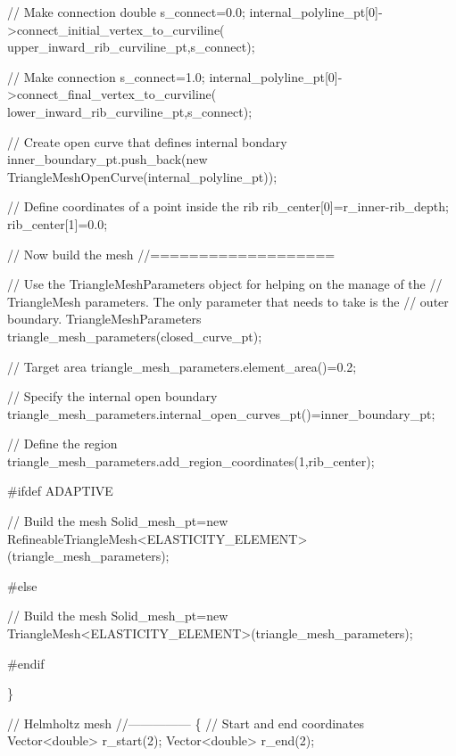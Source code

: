 \begin{DoxyCodeInclude}
  \textcolor{comment}{// Make connection}
  \textcolor{keywordtype}{double} s\_connect=0.0;
  internal\_polyline\_pt[0]->connect\_initial\_vertex\_to\_curviline(
   upper\_inward\_rib\_curviline\_pt,s\_connect);

  \textcolor{comment}{// Make connection}
  s\_connect=1.0;
  internal\_polyline\_pt[0]->connect\_final\_vertex\_to\_curviline(
   lower\_inward\_rib\_curviline\_pt,s\_connect);

  \textcolor{comment}{// Create open curve that defines internal bondary}
  inner\_boundary\_pt.push\_back(\textcolor{keyword}{new} TriangleMeshOpenCurve(internal\_polyline\_pt));
 
  \textcolor{comment}{// Define coordinates of a point inside the rib}
  rib\_center[0]=r\_inner-rib\_depth;
  rib\_center[1]=0.0;


  \textcolor{comment}{// Now build the mesh}
  \textcolor{comment}{//===================}

  \textcolor{comment}{// Use the TriangleMeshParameters object for helping on the manage of the}
  \textcolor{comment}{// TriangleMesh parameters. The only parameter that needs to take is the}
  \textcolor{comment}{// outer boundary.}
  TriangleMeshParameters triangle\_mesh\_parameters(closed\_curve\_pt);

  \textcolor{comment}{// Target area}
  triangle\_mesh\_parameters.element\_area()=0.2;

  \textcolor{comment}{// Specify the internal open boundary}
  triangle\_mesh\_parameters.internal\_open\_curves\_pt()=inner\_boundary\_pt;

  \textcolor{comment}{// Define the region}
  triangle\_mesh\_parameters.add\_region\_coordinates(1,rib\_center);
 
\textcolor{preprocessor}{#ifdef ADAPTIVE}

  \textcolor{comment}{// Build the mesh}
  Solid\_mesh\_pt=\textcolor{keyword}{new} 
   RefineableTriangleMesh<ELASTICITY\_ELEMENT>(triangle\_mesh\_parameters);

\textcolor{preprocessor}{#else}

  \textcolor{comment}{// Build the mesh}
  Solid\_mesh\_pt=\textcolor{keyword}{new} 
   TriangleMesh<ELASTICITY\_ELEMENT>(triangle\_mesh\_parameters);

\textcolor{preprocessor}{#endif}

 \}
 
 \textcolor{comment}{// Helmholtz mesh}
 \textcolor{comment}{//---------------}
 \{
  \textcolor{comment}{// Start and end coordinates}
  Vector<double> r\_start(2);
  Vector<double> r\_end(2);
 

\end{DoxyCodeInclude}
